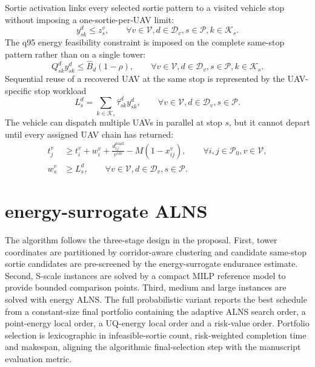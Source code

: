 \documentclass[final,5p,twocolumn,number,nopreprintline]{elsarticle}
\newcommand{\rev}[1]{{\color{blue}#1}}
\newenvironment{revblock}{\begingroup\color{blue}}{\endgroup}
\begin{document}
\begin{revblock}
Sortie activation links every selected sortie pattern to a visited vehicle stop without imposing a one-sortie-per-UAV limit:
\begin{equation}
y^d_{sk} \leq z_s^v,\qquad \forall v\in\mathcal{V}, d\in\mathcal{D}_v, s\in\mathcal{P}, k\in\mathcal{K}_s.
\label{eq:sortie-activation}
\end{equation}
The q95 energy feasibility constraint is imposed on the complete same-stop pattern rather than on a single tower:
\begin{equation}
Q^d_{sk} y^d_{sk} \leq \hat B_d(1-\rho),\qquad \forall v\in\mathcal{V}, d\in\mathcal{D}_v, s\in\mathcal{P}, k\in\mathcal{K}_s.
\label{eq:endurance}
\end{equation}
Sequential reuse of a recovered UAV at the same stop is represented by the UAV-specific stop workload
\begin{equation}
L_s^d=\sum_{k\in\mathcal{K}_s}\hat\tau^d_{sk}y^d_{sk},\qquad \forall v\in\mathcal{V}, d\in\mathcal{D}_v, s\in\mathcal{P}.
\label{eq:uav-chain}
\end{equation}
The vehicle can dispatch multiple UAVs in parallel at stop $s$, but it cannot depart until every assigned UAV chain has returned:
\begin{align}
t_j^v &\geq t_i^v+w_i^v+\frac{d^{\mathrm{road}}_{ij}}{v^{\mathrm{car}}}-M(1-x^v_{ij}),
\qquad \forall i,j\in\mathcal{P}_0,v\in\mathcal{V},
\label{eq:time-propagation}\\
w_s^v &\geq L_s^d,\qquad \forall v\in\mathcal{V},d\in\mathcal{D}_v,s\in\mathcal{P}.
\label{eq:launch-recovery-sync}
\end{align}
\end{revblock}

\section{energy-surrogate ALNS}
\label{sec:algorithm}

The algorithm follows the three-stage design in the proposal. First, tower coordinates are partitioned by corridor-aware clustering and candidate same-stop sortie candidates are pre-screened by the energy-surrogate endurance estimate. Second, S-scale instances are solved by a compact MILP reference model to provide bounded comparison points. Third, medium and large instances are solved with energy ALNS. \rev{The full probabilistic variant reports the best schedule from a constant-size final portfolio containing the adaptive ALNS search order, a point-energy local order, a UQ-energy local order and a risk-value order. Portfolio selection is lexicographic in infeasible-sortie count, risk-weighted completion time and makespan, aligning the algorithmic final-selection step with the manuscript evaluation metric.}
\end{document}
